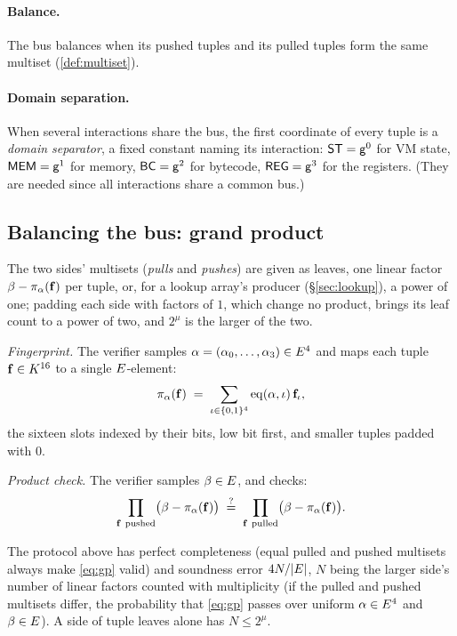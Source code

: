 \paragraph{Balance.} The bus balances when its pushed tuples and its pulled tuples form the same multiset (\ref{def:multiset}).

\paragraph{Domain separation.} When several interactions share the bus, the first coordinate of every tuple is a \emph{domain separator}, a fixed constant naming its interaction: $\mathsf{ST}=\mathsf{g}^{0}$ for VM state, $\mathsf{MEM}=\mathsf{g}^{1}$ for memory, $\mathsf{BC}=\mathsf{g}^{2}$ for bytecode, $\mathsf{REG}=\mathsf{g}^{3}$ for the registers. (They are needed since all interactions share a common bus.)

\subsection{Balancing the bus: grand product}\label{sec:gp}

The two sides' multisets (\emph{pulls} and \emph{pushes}) are given as leaves, one linear factor $\beta-\pi_\alpha(\mathbf{f})$ per tuple, or, for a lookup array's producer (\S\ref{sec:lookup}), a power of one; padding each side with factors of $1$, which change no product, brings its leaf count to a power of two, and $2^{\mu}$ is the larger of the two.

\emph{Fingerprint.} The verifier samples $\alpha=(\alpha_0,\dots,\alpha_3)\in E^{4}$ and maps each tuple $\mathbf{f} \in K^{16}$ to a single $E$-element:
\[
\pi_\alpha(\mathbf{f})\;=\;\sum_{\iota\in\{0,1\}^{4}}\operatorname{eq}(\alpha,\iota)\,\mathbf{f}_\iota ,
\]
the sixteen slots indexed by their bits, low bit first, and smaller tuples padded with $0$.

\emph{Product check.} The verifier samples $\beta\in E$, and checks:
\begin{equation}
\prod_{\btup\ \text{pushed}}\bigl(\beta-\pi_\alpha(\btup)\bigr)
\;\qeq\;
\prod_{\btup\ \text{pulled}}\bigl(\beta-\pi_\alpha(\btup)\bigr).
\label{eq:gp}
\end{equation}

\begin{theorem}\label{th:product_check}
  The protocol above has perfect completeness (equal pulled and pushed multisets always make \eqref{eq:gp} valid) and soundness error $4N/|E|$, $N$ being the larger side's number of linear factors counted with multiplicity (if the pulled and pushed multisets differ, the probability that \eqref{eq:gp} passes over uniform $\alpha \in E^{4}$ and $\beta \in E$). A side of tuple leaves alone has $N\le2^{\mu}$.
\end{theorem}


